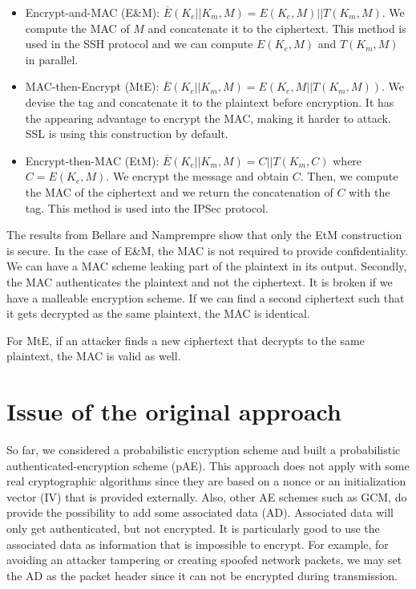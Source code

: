 \documentclass[10pt,a4paper]{article}
\begin{document}
\begin{itemize}
	\item Encrypt-and-MAC (E\&M): $\overline{E}(K_e||K_m, M) = E(K_e,M)||T(K_m, M)$.
		We compute the MAC of $M$ and concatenate it to the ciphertext.
		This method is used in the SSH protocol and we can compute $E(K_e,M)$ and $T(K_m, M)$ in parallel.
	\item MAC-then-Encrypt (MtE): $\overline{E}(K_e||K_m, M) = E(K_e,M||T(K_m, M))$.
		We devise the tag and concatenate it to the plaintext before encryption.
		It has the appearing advantage to encrypt the MAC, making it harder to attack.
		SSL is using this construction by default.
	\item Encrypt-then-MAC (EtM): $\overline{E}(K_e||K_m, M) = C||T(K_m,C)$ where $C = E(K_e, M)$.
		We encrypt the message and obtain $C$.
		Then, we compute the MAC of the ciphertext and we return the concatenation of $C$ with the tag.
		This method is used into the IPSec protocol.
\end{itemize}

The results from Bellare and Namprempre show that only the EtM construction is secure.
In the case of E\&M, the MAC is not required to provide confidentiality.
We can have a MAC scheme leaking part of the plaintext in its output.
Secondly, the MAC authenticates the plaintext and not the ciphertext.
It is broken if we have a malleable encryption scheme.
If we can find a second ciphertext such that it gets decrypted as the same plaintext, the MAC is identical.

For MtE, if an attacker finds a new ciphertext that decrypts to the same plaintext, the MAC is valid as well.

\section{Issue of the original approach}
So far, we considered a probabilistic encryption scheme and built a probabilistic authenticated-encryption scheme (pAE).
This approach does not apply with some real cryptographic algorithms since they are based on a nonce or an initialization vector (IV) that is provided externally.
Also, other AE schemes such as GCM, do provide the possibility to add some associated data (AD).
Associated data will only get authenticated, but not encrypted.
It is particularly good to use the associated data as information that is impossible to encrypt.
For example, for avoiding an attacker tampering or creating spoofed network packets, we may set the AD as the packet header since it can not be encrypted during transmission.
\end{document}

